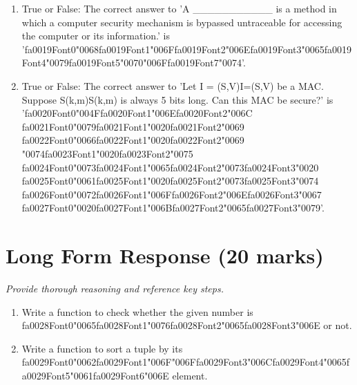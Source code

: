 \documentclass[12pt]{article}
\begin{document}
\begin{enumerate}[label=\arabic*.]
\item True or False: The correct answer to 'A \_\_\_\_\_\_\_\_\_\_\_ is a method in which a computer security mechanism is bypassed untraceable for accessing the computer or its information.' is '{\csname fa0019Font0\endcsname\char"0068}{\csname fa0019Font1\endcsname\char"006F}{\csname fa0019Font2\endcsname\char"006E}{\csname fa0019Font3\endcsname\char"0065}{\csname fa0019Font4\endcsname\char"0079}{\csname fa0019Font5\endcsname\char"0070}{\char"006F}{\csname fa0019Font7\endcsname\char"0074}'.
\item True or False: The correct answer to 'Let I = (S,V)I=(S,V) be a MAC. Suppose S(k,m)S(k,m) is always 5 bits long. Can this MAC be secure?' is '{\csname fa0020Font0\endcsname\char"004F}{\csname fa0020Font1\endcsname\char"006E}{\csname fa0020Font2\endcsname\char"006C} {\csname fa0021Font0\endcsname\char"0079}{\csname fa0021Font1\endcsname\char"0020}{\csname fa0021Font2\endcsname\char"0069} {\csname fa0022Font0\endcsname\char"0066}{\csname fa0022Font1\endcsname\char"0020}{\csname fa0022Font2\endcsname\char"0069} {\char"0074}{\csname fa0023Font1\endcsname\char"0020}{\csname fa0023Font2\endcsname\char"0075} {\csname fa0024Font0\endcsname\char"0073}{\csname fa0024Font1\endcsname\char"0065}{\csname fa0024Font2\endcsname\char"0073}{\csname fa0024Font3\endcsname\char"0020} {\csname fa0025Font0\endcsname\char"0061}{\csname fa0025Font1\endcsname\char"0020}{\csname fa0025Font2\endcsname\char"0073}{\csname fa0025Font3\endcsname\char"0074} {\csname fa0026Font0\endcsname\char"0072}{\csname fa0026Font1\endcsname\char"006F}{\csname fa0026Font2\endcsname\char"006E}{\csname fa0026Font3\endcsname\char"0067} {\csname fa0027Font0\endcsname\char"0020}{\csname fa0027Font1\endcsname\char"006B}{\csname fa0027Font2\endcsname\char"0065}{\csname fa0027Font3\endcsname\char"0079}'.
\end{enumerate}

\section*{Long Form Response (20 marks)}
\textit{Provide thorough reasoning and reference key steps.}
\begin{enumerate}[label=\arabic*.]
\item Write a function to check whether the given number is {\csname fa0028Font0\endcsname\char"0065}{\csname fa0028Font1\endcsname\char"0076}{\csname fa0028Font2\endcsname\char"0065}{\csname fa0028Font3\endcsname\char"006E} or not.
\item Write a function to sort a tuple by its {\csname fa0029Font0\endcsname\char"0062}{\csname fa0029Font1\endcsname\char"006F}{\char"006F}{\csname fa0029Font3\endcsname\char"006C}{\csname fa0029Font4\endcsname\char"0065}{\csname fa0029Font5\endcsname\char"0061}{\csname fa0029Font6\endcsname\char"006E} element.
\end{enumerate}
\end{document}
